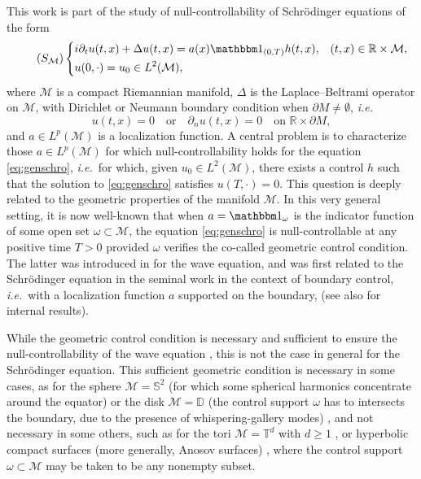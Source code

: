 \documentclass[a4paper,11pt]{amsart}
\numberwithin{equation}{section}
\theoremstyle{definition}
\begin{document}
This work is part of the study of null-controllability of Schr\"odinger equations of the form
\begin{equation}\label{eq:genschro}\tag{$S_{\mathcal M}$}
	\left\{\begin{aligned}
		& i\partial_t u(t,x) + \Delta u(t,x) = a(x)\mathbbm 1_{(0,T)}h(t,x),  & (t,x)\in\mathbb R\times\mathcal M, \\
		& u(0,\cdot) = u_0\in L^2(\mathcal M),
	\end{aligned}\right.
\end{equation}
where $\mathcal M$ is a compact Riemannian manifold, $\Delta$ is the Laplace--Beltrami operator on $\mathcal M$, with Dirichlet or Neumann boundary condition when $\partial M\ne\emptyset$, \textit{i.e.}
\[
    u(t,x) = 0\quad \text{or}\quad \partial_nu(t,x) = 0\quad \text{on $\mathbb R\times\partial M$}, 
\]
and $a\in L^p(\mathcal M)$ is a localization function.
A central problem is to characterize those $a\in L^p(\mathcal M)$ for which null-controllability holds for the equation \eqref{eq:genschro}, \textit{i.e.}~for which, given $u_0 \in L^2(\mathcal M)$, there exists a control  $h$ such that the solution to \eqref{eq:genschro} satisfies $u(T,\cdot) = 0$. This question is deeply related to the geometric properties of the manifold $\mathcal M$. In this very general setting, it is now well-known that when $a = \mathbbm1_{\omega}$ is the indicator function of some open set $\omega\subset\mathcal M$, the equation \eqref{eq:genschro} is null-controllable at any positive time $T>0$ provided $\omega$ verifies the co-called geometric control condition. The latter was introduced in \cite{BLR, RT} for the wave equation, and was first related to the Schr\"odinger equation in the seminal work \cite{L} in the context of boundary control, \textit{i.e.}~with a localization function $a$ supported on the boundary, (see also \cite{Ma, P} for internal results).

While the geometric control condition is necessary and sufficient to ensure the null-controllability of the wave equation \cite{BG}, this is not the case in general for the Schr\"odinger equation. This sufficient geometric condition is necessary in some cases, as for the sphere $\mathcal M = \mathbb S^2$ (for which some spherical harmonics concentrate around the equator) or the disk $\mathcal M = \mathbb D$ (the control support $\omega$ has to intersects the boundary, due to the presence of whispering-gallery modes) \cite{ALM}, and not necessary in some others, such as for the tori $\mathcal M = \mathbb T^d$ with $d\geq1$ \cite{Jaf,K}, or  hyperbolic compact surfaces (more generally, Anosov surfaces) \cite{DJN, J}, where the control support $\omega\subset\mathcal M$ may be taken to be any nonempty subset. 
\end{document}
